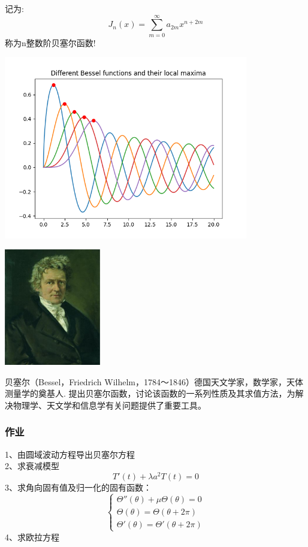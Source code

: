 \begin{frame}
	记为: \[\boxed{J_n(x) = \sum\limits_{m=0}^{\infty} a_{2m} x^{n+2m}} 
		 \]
	称为n整数阶贝塞尔函数! 
\end{frame}	

\begin{frame}
	\centering
	\includegraphics[width=0.8\textwidth]{figs/bessel.png}
\end{frame}	

\begin{frame}
	\begin{center}
			\includegraphics[width=4.2cm]{figs/fig1-3-6.png}	
	\end{center}
	贝塞尔（Bessel，Friedrich Wilhelm，1784～1846）德国天文学家，数学家，天体测量学的奠基人.
	提出贝塞尔函数，讨论该函数的一系列性质及其求值方法，为解决物理学、天文学和信息学有关问题提供了重要工具。
\end{frame}

\begin{frame}
	\frametitle{作业}
	1、由圆域波动方程导出贝塞尔方程\\
	2、求衰减模型
	\begin{equation*}
		T'(t)+\lambda a^2T(t)=0  
	\end{equation*}
	3、求角向固有值及归一化的固有函数：\\
	\[ \begin{cases}
		\Theta ''(\theta)+\mu \Theta (\theta) =0 \\
		\Theta (\theta) =	\Theta (\theta+2\pi)  \\
		\Theta' (\theta) =	\Theta' (\theta+2\pi)  
	\end{cases}  \]	
	4、求欧拉方程
\end{frame}	

